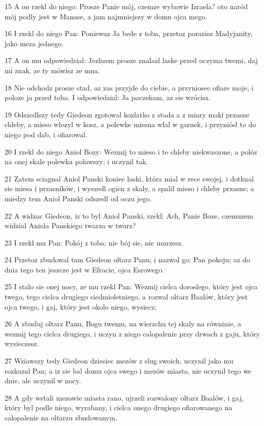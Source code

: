 \par 15 A on rzekl do niego: Prosze Panie mój, czemze wybawie Izraela? oto naród mój podly jest w Manase, a jam najmniejszy w domu ojca mego.
\par 16 I rzekl do niego Pan: Poniewaz Ja bede z toba, przetoz porazisz Madyjanity, jako meza jednego.
\par 17 A on mu odpowiedzial: Jezlizem prosze znalazl laske przed oczyma twemi, daj mi znak, ze ty mówisz ze mna.
\par 18 Nie odchodz prosze stad, az zas przyjde do ciebie, a przyniosec ofiare moje, i poloze ja przed toba. I odpowiedzial: Ja poczekam, az sie wrócisz.
\par 19 Odszedlszy tedy Giedeon zgotowal kozlatko z stada a z miary maki przasne chleby, a mieso wlozyl w kosz, a polewke miesna wlal w garnek, i przyniósl to do niego pod dab, i ofiarowal.
\par 20 I rzekl do niego Aniol Bozy: Wezmij to mieso i te chleby niekwaszone, a polóz na onej skale polewka polawszy; i uczynil tak.
\par 21 Zatem sciagnal Aniol Panski koniec laski, która mial w rece swojej, i dotknal sie miesa i przasników, i wyszedl ogien z skaly, a spalil mieso i chleby przasne; a miedzy tem Aniol Panski odszedl od oczu jego.
\par 22 A widzac Giedeon, iz to byl Aniol Panski, rzekl: Ach, Panie Boze, czemuzem widzial Aniola Panskiego twarza w twarz?
\par 23 I rzekl mu Pan: Pokój z toba; nie bój sie, nie umrzesz.
\par 24 Przetoz zbudowal tam Giedeon oltarz Panu, i nazwal go: Pan pokoju; az do dnia tego ten jeszcze jest w Efracie, ojca Esrowego.
\par 25 I stalo sie onej nocy, ze mu rzekl Pan: Wezmij cielca doroslego, który jest ojca twego, tego cielca drugiego siedmioletniego, a rozwal oltarz Baalów, który jest ojca twego, i gaj, który jest okolo niego, wysiecz;
\par 26 A zbuduj oltarz Panu, Bogu twemu, na wierzchu tej skaly na równinie, a wezmij tego cielca drugiego, i uczyn z niego calopalenie przy drwach z gaju, który wysieczesz.
\par 27 Wziawszy tedy Giedeon dziesiec mezów z slug swoich, uczynil jako mu rozkazal Pan; a iz sie bal domu ojca swego i mezów miasta, nie uczynil tego we dnie, ale uczynil w nocy.
\par 28 A gdy wstali mezowie miasta rano, ujrzeli rozwalony oltarz Baalów, i gaj, który byl podle niego, wyrabany, i cielca onego drugiego ofiarowanego na calopalenie na oltarzu zbudowanym.
